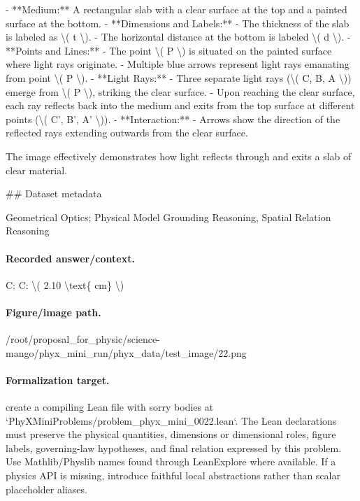 - **Medium:** A rectangular slab with a clear surface at the top and a painted surface at the bottom.
- **Dimensions and Labels:** 
  - The thickness of the slab is labeled as \textbackslash{}( t \textbackslash{}).
  - The horizontal distance at the bottom is labeled \textbackslash{}( d \textbackslash{}).
- **Points and Lines:**
  - The point \textbackslash{}( P \textbackslash{}) is situated on the painted surface where light rays originate.
  - Multiple blue arrows represent light rays emanating from point \textbackslash{}( P \textbackslash{}).
- **Light Rays:**
  - Three separate light rays (\textbackslash{}( C, B, A \textbackslash{})) emerge from \textbackslash{}( P \textbackslash{}), striking the clear surface.
  - Upon reaching the clear surface, each ray reflects back into the medium and exits from the top surface at different points (\textbackslash{}( C', B', A' \textbackslash{})).
- **Interaction:**
  - Arrows show the direction of the reflected rays extending outwards from the clear surface.

The image effectively demonstrates how light reflects through and exits a slab of clear material.

\#\# Dataset metadata

Geometrical Optics; Physical Model Grounding Reasoning, Spatial Relation Reasoning

\paragraph{Recorded answer/context.}
C: C: \textbackslash{}( 2.10 \textbackslash{}text\{ cm\} \textbackslash{})

\paragraph{Figure/image path.}
/root/proposal\_for\_physic/science-mango/phyx\_mini\_run/phyx\_data/test\_image/22.png

\paragraph{Formalization target.}
create a compiling Lean file with sorry bodies at `PhyXMiniProblems/problem\_phyx\_mini\_0022.lean`. The Lean declarations must preserve the physical quantities, dimensions or dimensional roles, figure labels, governing-law hypotheses, and final relation expressed by this problem.
Use Mathlib/Physlib names found through LeanExplore where available. If a physics API is missing, introduce faithful local abstractions rather than scalar placeholder aliases.

